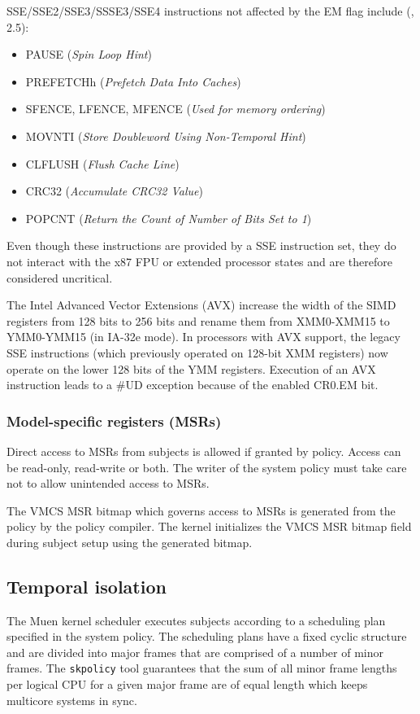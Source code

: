 SSE/SSE2/SSE3/SSSE3/SSE4 instructions not affected by the EM flag include
(\cite{IntelSDM}, 2.5):
\begin{itemize}
	\item PAUSE (\emph{Spin Loop Hint})
	\item PREFETCHh (\emph{Prefetch Data Into Caches})
	\item SFENCE, LFENCE, MFENCE (\emph{Used for memory ordering})
	\item MOVNTI (\emph{Store Doubleword Using Non-Temporal Hint})
	\item CLFLUSH (\emph{Flush Cache Line})
	\item CRC32 (\emph{Accumulate CRC32 Value})
	\item POPCNT (\emph{Return the Count of Number of Bits Set to 1})
\end{itemize}

Even though these instructions are provided by a SSE instruction set, they do
not interact with the x87 FPU or extended processor states and are therefore
considered uncritical.

The Intel Advanced Vector Extensions (AVX) increase the width of the
SIMD registers from 128 bits to 256 bits and rename them from XMM0-XMM15 to
YMM0-YMM15 (in IA-32e mode). In processors with AVX support, the legacy SSE
instructions (which previously operated on 128-bit XMM registers) now operate on
the lower 128 bits of the YMM registers. Execution of an AVX instruction leads
to a \#UD exception because of the enabled CR0.EM bit.

\subsubsection{Model-specific registers (MSRs)}
Direct access to MSRs from subjects is allowed if granted by policy. Access can
be read-only, read-write or both. The writer of the system policy must take care
not to allow unintended access to MSRs.

The VMCS MSR bitmap which governs access to MSRs is generated from the policy by
the policy compiler. The kernel initializes the VMCS MSR bitmap field during
subject setup using the generated bitmap.

\subsection{Temporal isolation}
The Muen kernel scheduler executes subjects according to a scheduling plan
specified in the system policy. The scheduling plans have a fixed cyclic
structure and are divided into major frames that are comprised of a number of
minor frames. The \texttt{skpolicy} tool guarantees that the sum of all minor
frame lengths per logical CPU for a given major frame are of equal length which
keeps multicore systems in sync.

